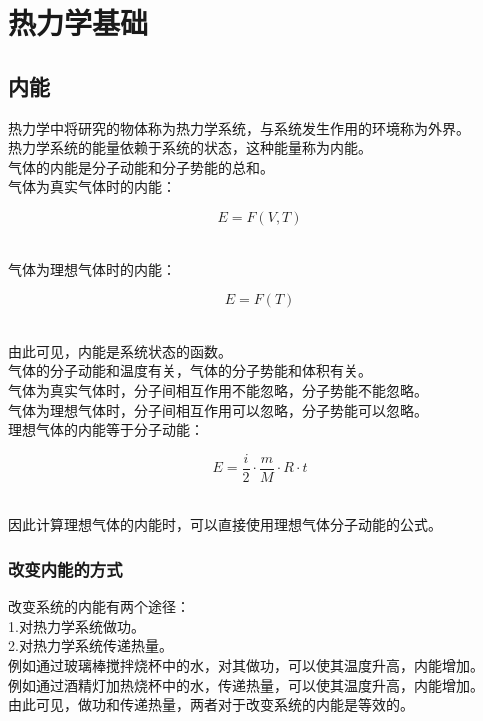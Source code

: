 \documentclass[UTF8]{ctexart}
\begin{document}
\newpage

\section{热力学基础}

\subsection{内能}
    热力学中将研究的物体称为热力学系统，与系统发生作用的环境称为外界。\\[3mm]
    热力学系统的能量依赖于系统的状态，这种能量称为内能。\\[3mm]
    气体的内能是分子动能和分子势能的总和。\\[3mm]
    气体为真实气体时的内能：
    \begin{large}
        \begin{equation*}
            E=F(V,T)
        \end{equation*}
    \end{large}\\
    气体为理想气体时的内能：
    \begin{large}
        \begin{equation*}
            E=F(T)
        \end{equation*}
    \end{large}\\
    由此可见，内能是系统状态的函数。\\[3mm]
    气体的分子动能和温度有关，气体的分子势能和体积有关。\\[3mm]
    气体为真实气体时，分子间相互作用不能忽略，分子势能不能忽略。\\[3mm]
    气体为理想气体时，分子间相互作用可以忽略，分子势能可以忽略。\\[3mm]
    理想气体的内能等于分子动能：
    \begin{large}
        \begin{equation*}
            E=\frac{i}{2}\cdot\frac{m}{M}\cdot R\cdot t
        \end{equation*}
    \end{large}\\
    因此计算理想气体的内能时，可以直接使用理想气体分子动能的公式。

\subsubsection{改变内能的方式}
    改变系统的内能有两个途径：\\[3mm]
    1.对热力学系统做功。\\[3mm]
    2.对热力学系统传递热量。\\[6mm]
    例如通过玻璃棒搅拌烧杯中的水，对其做功，可以使其温度升高，内能增加。\\[3mm]
    例如通过酒精灯加热烧杯中的水，传递热量，可以使其温度升高，内能增加。\\[3mm]
    由此可见，做功和传递热量，两者对于改变系统的内能是等效的。\\[3mm]
\end{document}
